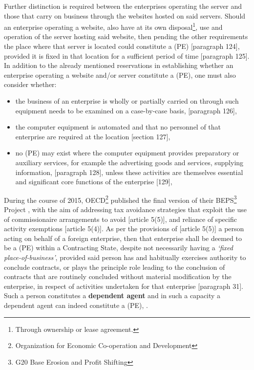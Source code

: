 \documentclass[11pt]{article}
\begin{document}
Further distinction is required between the enterprises operating the server and
those that carry on business through the websites hosted on said servers.
Should an enterprise operating a website, also have at its own
disposal\footnote{Through ownership or lease agreement.}, use and operation of the
server hosting said website, then pending the other requirements the place where
that server is located could constitute a (PE) [paragraph
124]\cite{oecd17_model_tax}, provided it is fixed in that location for a
sufficient period of time [paragraph 125]\cite{oecd17_model_tax}.\\

In addition to the already mentioned reservations in establishing whether an
enterprise operating a website and/or server constitute a (PE), one must also
consider whether:
\begin{itemize}
\item the business of an enterprise is wholly or partially carried on through such
equipment needs to be examined on a case-by-case basis, [paragraph 126]\cite{oecd17_model_tax},
\item the computer equipment is automated and that no personnel of that enterprise
are required at the location [section 127]\cite{oecd17_model_tax},
\item no (PE) may exist where the computer equipment provides preparatory or
auxiliary services, for example the advertising goods and services, supplying
information, [paragraph 128]\cite{oecd17_model_tax}, unless these activities are
themselves essential and significant core functions of the enterprise [129]\cite{oecd17_model_tax},
\end{itemize}



During the course of 2015, OECD\footnote{Organization for Economic Co-operation and
Development} published the final version of their BEPS\footnote{G20 Base Erosion and
Profit Shifting} Project \cite{oecd15_action7}, with the aim of addressing tax
avoidance strategies that exploit the use of commissionaire arrangements to
avoid [article 5(5)]\cite{oecd17_model_tax}, and reliance of specific activity
exemptions [article 5(4)]\cite{oecd17_model_tax}. As per the provisions of
[article 5(5)]\cite{oecd17_model_tax} a person acting on behalf of a foreign
enterprise, then that enterprise shall be deemed to be a (PE) within a
Contracting State, despite not necessarily having a \emph{`fixed place-of-business'},
provided said person has and habitually exercises authority to conclude
contracts, or plays the principle role leading to the conclusion of contracts
that are routinely concluded without material modification by the enterprise, in
respect of activities undertaken for that enterprise [paragraph
31]\cite{oecd15_action7}. Such a person constitutes a \textbf{dependent agent} and in
such a capacity a dependent agent can indeed constitute a (PE),
\cite{oecd18_additional_guidance}.

\printbibliography
\end{document}
